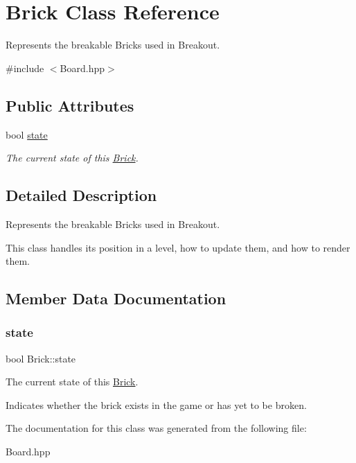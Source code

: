 \hypertarget{classBrick}{}\section{Brick Class Reference}
\label{classBrick}


Represents the breakable Bricks used in Breakout.  




{\ttfamily \#include $<$Board.\+hpp$>$}

\subsection*{Public Attributes}
\begin{DoxyCompactItemize}
\item 
bool \hyperlink{classBrick_a8fb3a7ffb8f9a34efeb6a9559940c498}{state}
\begin{DoxyCompactList}\small\item\em The current state of this \hyperlink{classBrick}{Brick}. \end{DoxyCompactList}\end{DoxyCompactItemize}


\subsection{Detailed Description}
Represents the breakable Bricks used in Breakout. 

This class handles its position in a level, how to update them, and how to render them. 

\subsection{Member Data Documentation}
\mbox{\label{classBrick_a8fb3a7ffb8f9a34efeb6a9559940c498}} 
\subsubsection{\texorpdfstring{state}{state}}
{\footnotesize\ttfamily bool Brick\+::state}



The current state of this \hyperlink{classBrick}{Brick}. 

Indicates whether the brick exists in the game or has yet to be broken. 

The documentation for this class was generated from the following file\+:\begin{DoxyCompactItemize}
\item 
Board.\+hpp\end{DoxyCompactItemize}
